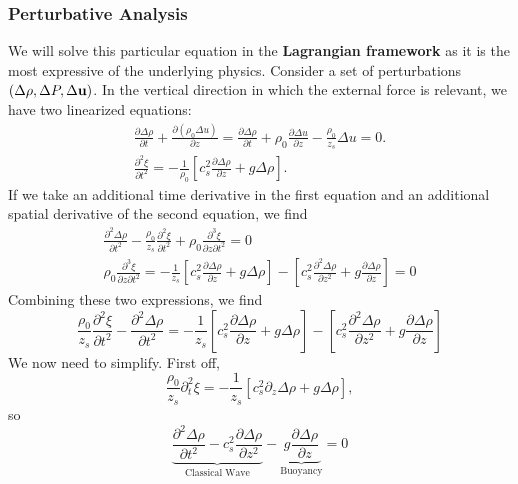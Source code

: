 \subsubsection*{Perturbative Analysis}

We will solve this particular equation in the \textbf{Lagrangian framework} as it is the most expressive of the underlying physics. Consider a set of perturbations $(\Delta \rho, \Delta P, \Delta {\bf u})$. In the vertical direction in which the external force is relevant, we have two linearized equations:
\begin{equation}
    \begin{aligned}
        \frac{\partial \Delta \rho}{\partial t} + \frac{\partial (\rho_0 \Delta u)}{\partial z} = \frac{\partial \Delta \rho}{\partial t} +\rho_0 \frac{\partial \Delta u}{\partial z} - \frac{\rho_0}{z_s} \Delta u = 0.\\
        \frac{\partial^2 \xi}{\partial t^2} = -\frac{1}{\rho_0} \left[c_s^2\frac{\partial \Delta \rho}{\partial z} + g\Delta \rho\right].
    \end{aligned}
\end{equation}
If we take an additional time derivative in the first equation and an additional spatial derivative of the second equation, we find
\[
\begin{aligned}
    \frac{\partial^2 \Delta \rho}{\partial t^2} -\frac{\rho_0}{z_s} \frac{\partial^2 \xi}{\partial t^2} + \rho_0 \frac{\partial^3 \xi}{\partial z \partial t^2}= 0\\
    \rho_0\frac{\partial^3 \xi}{\partial z \partial t^2} = -\frac{1}{z_s} \left[c_s^2 \frac{\partial \Delta \rho}{\partial z} + g\Delta \rho\right] - \left[c_s^2 \frac{\partial ^2 \Delta \rho}{\partial z^2} + g \frac{\partial \Delta \rho}{\partial z}\right] = 0 
\end{aligned}
\]
Combining these two expressions, we find
\[
\frac{\rho_0}{z_s} \frac{\partial^2 \xi}{\partial t^2} - \frac{\partial ^2 \Delta \rho}{\partial t^2}= -\frac{1}{z_s} \left[c_s^2 \frac{\partial \Delta \rho}{\partial z} + g\Delta \rho\right] - \left[c_s^2 \frac{\partial ^2 \Delta \rho}{\partial z^2} + g \frac{\partial \Delta \rho}{\partial z}\right] 
\]
We now need to simplify. First off, 
\[
\frac{\rho_0}{z_s} \partial_t^2\xi = - \frac{1}{z_s} \left[c_s^2\partial_z\Delta \rho + g\Delta \rho\right],
\]
so
\begin{equation}
\label{eq:stratified_wave_equation}
\boxed{
   \underbrace{ \frac{\partial^2 \Delta \rho}{\partial t^2} - c_s^2\frac{\partial \Delta \rho}{\partial z^2}}_{\text{Classical Wave}} -\underbrace{g\frac{\partial \Delta \rho}{\partial z}}_{\text{Buoyancy}} = 0
    }
\end{equation}
